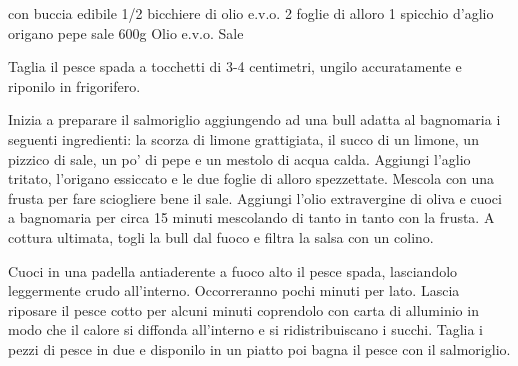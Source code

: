 \begin{ingreds}
	  con buccia edibile
	1/2 bicchiere di olio e.v.o.
	2 foglie di alloro
	1 spicchio d'aglio
	origano
	pepe
	sale
\columnbreak
     	600g 
     	Olio e.v.o.
	Sale
\end{ingreds}

\begin{method}
Taglia il pesce spada a tocchetti di 3-4 centimetri, ungilo accuratamente e riponilo in frigorifero.

Inizia a preparare il salmoriglio aggiungendo ad una bull adatta al bagnomaria i seguenti ingredienti: la scorza di limone grattigiata, il succo di un limone, un pizzico di sale, un po' di pepe e un mestolo di acqua calda. Aggiungi l'aglio tritato, l'origano essiccato e le due foglie di alloro spezzettate. Mescola con una frusta per fare sciogliere bene il sale. Aggiungi l'olio extravergine di oliva e cuoci a bagnomaria per circa 15 minuti mescolando di tanto in tanto con la frusta. A cottura ultimata, togli la bull dal fuoco e filtra la salsa con un colino.

Cuoci in una padella antiaderente a fuoco alto il pesce spada, lasciandolo leggermente crudo all'interno. Occorreranno pochi minuti per lato. Lascia riposare il pesce cotto per alcuni minuti coprendolo con carta di alluminio in modo che il calore si diffonda all'interno e si ridistribuiscano i succhi. Taglia i pezzi di pesce in due e disponilo in un piatto poi bagna il pesce con il salmoriglio.

\end {method}



